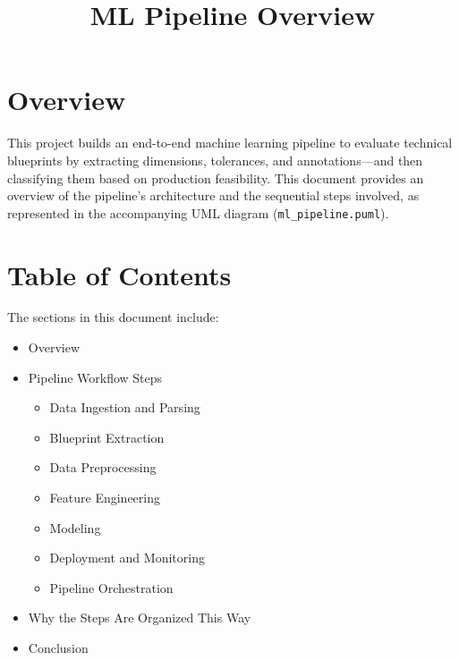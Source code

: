 \documentclass{article}
\title{ML Pipeline Overview}
\date{}
\begin{document}
\maketitle

\tableofcontents
\bigskip

\section{Overview}
This project builds an end-to-end machine learning pipeline to evaluate technical blueprints by extracting dimensions, tolerances, and annotations---and then classifying them based on production feasibility. This document provides an overview of the pipeline's architecture and the sequential steps involved, as represented in the accompanying UML diagram (\verb|ml_pipeline.puml|).

\section{Table of Contents}
The sections in this document include:
\begin{itemize}[label={--}]
    \item Overview
    \item Pipeline Workflow Steps
    \begin{itemize}[label={-}]
        \item Data Ingestion and Parsing
        \item Blueprint Extraction
        \item Data Preprocessing
        \item Feature Engineering
        \item Modeling
        \item Deployment and Monitoring
        \item Pipeline Orchestration
    \end{itemize}
    \item Why the Steps Are Organized This Way
    \item Conclusion
\end{itemize}
\end{document}
